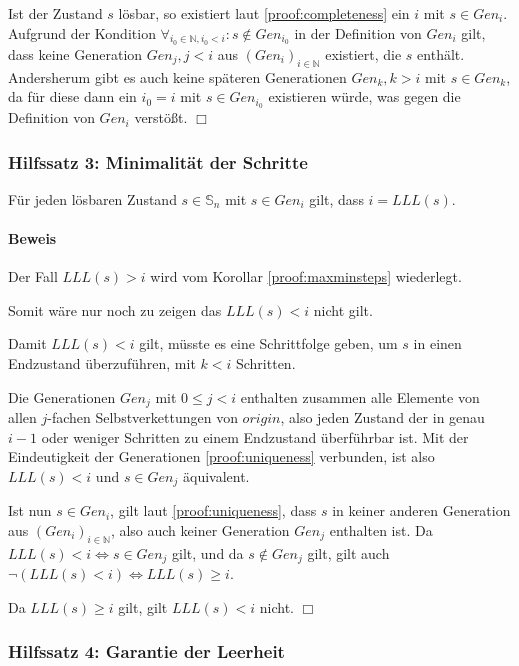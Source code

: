 \documentclass[a4paper,10pt,ngerman]{scrartcl}
\begin{document}
Ist der Zustand \(s\) lösbar, so existiert laut \cref{proof:completeness} ein \(i\) mit \(s \in Gen_i\). Aufgrund der Kondition \(\forall_{i_0\in\mathbb{N}, i_0 < i}: s \notin Gen_{i_0}\) in der Definition von \(Gen_i\) gilt, dass keine Generation \(Gen_j, j < i\) aus \((Gen_i)_{i\in\mathbb{N}}\) existiert, die \(s\) enthält. Andersherum gibt es auch keine späteren Generationen \(Gen_k, k > i\) mit \(s \in Gen_k\), da für diese dann ein \(i_0 = i\) mit \(s \in Gen_{i_0}\) existieren würde, was gegen die Definition von \(Gen_i\) verstößt. \(\Box\)

\subsubsection{Hilfssatz 3: Minimalität der Schritte} \label{proof:minimality}

Für jeden lösbaren Zustand \(s \in \mathbb{S}_n\) mit \(s \in Gen_i\) gilt, dass \(i = LLL(s)\).

\paragraph{Beweis}

Der Fall \(LLL(s) > i\) wird vom Korollar \cref{proof:maxminsteps} wiederlegt.

Somit wäre nur noch zu zeigen das \(LLL(s) < i\) nicht gilt.

Damit \(LLL(s) < i\) gilt, müsste es eine Schrittfolge geben, um \(s\) in einen Endzustand überzuführen, mit \(k < i\) Schritten.

Die Generationen \(Gen_j\) mit \(0 \leq j < i\) enthalten zusammen alle Elemente von allen \(j\)-fachen Selbstverkettungen von \(origin\), also jeden Zustand der in genau \(i-1\) oder weniger Schritten zu einem Endzustand überführbar ist. Mit der Eindeutigkeit der Generationen \cref{proof:uniqueness} verbunden, ist also \(LLL(s) < i\) und \(s \in Gen_j\) äquivalent.

Ist nun \(s \in Gen_i\), gilt laut \cref{proof:uniqueness}, dass \(s\) in keiner anderen Generation aus \((Gen_i)_{i\in\mathbb{N}}\), also auch keiner Generation \(Gen_j\) enthalten ist. Da \(LLL(s) < i \iff s \in Gen_j\) gilt, und da \(s \notin Gen_j\) gilt, gilt auch \(\lnot(LLL(s) < i) \iff LLL(s) \geq i\).

Da \(LLL(s) \geq i\) gilt, gilt \(LLL(s) < i\) nicht. \(\Box\)

\subsubsection{Hilfssatz 4: Garantie der Leerheit} \label{proof:termination}
\end{document}
